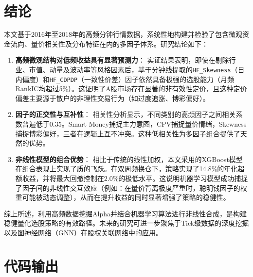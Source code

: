 \documentclass[10pt,compsoc,UTF8]{CjC}
\begin{document}
\section{结论}

本文基于2016年至2018年的高频分钟行情数据，系统性地构建并检验了包含微观资金流向、量价相关性及分布特征在内的多因子体系。研究结论如下：

\begin{enumerate}
    \item \textbf{高频微观结构对低频收益具有显著预测力}：
    实证结果表明，即使在剔除行业、市值、动量及波动率等风格因素后，基于分钟线提取的\texttt{HF\_Skewness}（日内偏度）和\texttt{HF\_CDPDP}（一致性价差）因子依然具备极强的选股能力（月频RankIC均超过5\%）。这证明了A股市场存在显著的非有效性定价，且这种定价偏差主要源于散户的非理性交易行为（如过度追涨、博彩偏好）。

    \item \textbf{因子的正交性与互补性}：
    相关性分析显示，不同类别的高频因子之间相关系数普遍低于0.35。Smart Money捕捉主力意图，CPV捕捉量价情绪，Skewness捕捉博彩偏好，三者在逻辑上互不冲突。这种低相关性为多因子组合提供了天然的优势。

    \item \textbf{非线性模型的组合优势}：
    相比于传统的线性加权，本文采用的XGBoost模型在组合表现上实现了质的飞跃。在双周频换仓下，策略实现了14.8\%的年化超额收益，并将最大回撤控制在2.0\%的极低水平。这说明机器学习模型成功捕捉了因子间的非线性交互效应（例如：在量价背离极度严重时，聪明钱因子的权重可能被动态调整），从而在提升收益的同时显著增强了策略的稳健性。
\end{enumerate}

综上所述，利用高频数据挖掘Alpha并结合机器学习算法进行非线性合成，是构建稳健量化选股策略的有效路径。未来的研究可进一步聚焦于Tick级数据的深度挖掘以及图神经网络（GNN）在股权关联网络中的应用。

\newpage
\section{代码输出}
\end{document}
